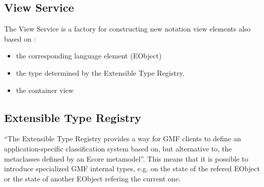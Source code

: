 \subsection{View Service}
The View Service is a factory for constructing new notation view elements also based on \cite{GMFDoc}:
\begin{itemize}
	\item the corresponding language element (EObject)
	\item the type determined by the Extensible Type Registry.
	\item the container view  
\end{itemize}

\subsection{Extensible Type Registry}
``The Extensible Type Registry provides a way for GMF clients to define an application-specific classification system based on, but alternative to, the metaclasses defined by an Ecore metamodel''\cite{GMFDoc}. This means that it is possible to introduce specialized GMF internal types, e.g. on the state of the refered EObject or the state of another EObject refering the current one.